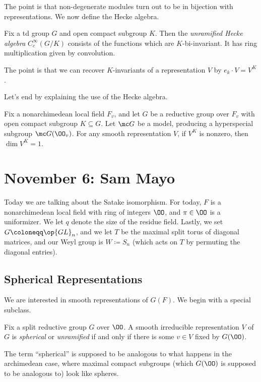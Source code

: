\documentclass{article}
\begin{document}
The point is that non-degenerate modules turn out to be in bijection with representations. We now define the Hecke algebra.
\begin{definition}
	Fix a td group $G$ and open compact subgroup $K$. Then the \textit{unramified Hecke algebra} $C_c^\infty(G/K)$ consists of the functions which are $K$-bi-invariant. It has ring multiplication given by convolution.
\end{definition}
The point is that we can recover $K$-invariants of a representation $V$ by $e_k\cdot V=V^K$.

Let's end by explaining the use of the Hecke algebra.
\begin{theorem}
	Fix a nonarchimedean local field $F_v$, and let $G$ be a reductive group over $F_v$ with open compact subgroup $K\subseteq G$. Let $\mc G$ be a model, producing a hyperspecial subgroup $\mc G(\OO_v)$. For any smooth representation $V$, if $V^K$ is nonzero, then $\dim V^K=1$.
\end{theorem}

\section{November 6: Sam Mayo}
Today we are talking about the Satake isomorphism. For today, $F$ is a nonarchimedean local field with ring of integers $\OO$, and $\pi\in\OO$ is a uniformizer. We let $q$ denote the size of the residue field. Lastly, we set $G\coloneqq\op{GL}_n$, and we let $T$ be the maximal split torus of diagonal matrices, and our Weyl group is $W\coloneqq S_n$ (which acts on $T$ by permuting the diagonal entries).

\subsection{Spherical Representations}
We are interested in smooth representations of $G(F)$. We begin with a special subclass.
\begin{definition}
	Fix a split reductive group $G$ over $\OO$. A smooth irreducible representation $V$ of $G$ is \textit{spherical} or \textit{unramified} if and only if there is some $v\in V$ fixed by $G(\OO)$.
\end{definition}
The term ``spherical'' is supposed to be analogous to what happens in the archimedean case, where maximal compact subgroups (which $G(\OO)$ is supposed to be analogous to) look like spheres.
\end{document}
